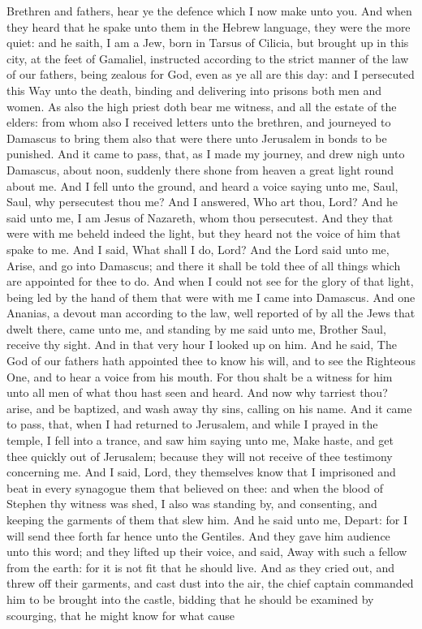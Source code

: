 Brethren and fathers, hear ye the defence which I now make unto you.  And when they heard that he spake unto them in the Hebrew language, they were the more quiet: and he saith,  I am a Jew, born in Tarsus of Cilicia, but brought up in this city, at the feet of Gamaliel, instructed according to the strict manner of the law of our fathers, being zealous for God, even as ye all are this day: and I persecuted this Way unto the death, binding and delivering into prisons both men and women. As also the high priest doth bear me witness, and all the estate of the elders: from whom also I received letters unto the brethren, and journeyed to Damascus to bring them also that were there unto Jerusalem in bonds to be punished. And it came to pass, that, as I made my journey, and drew nigh unto Damascus, about noon, suddenly there shone from heaven a great light round about me. And I fell unto the ground, and heard a voice saying unto me, Saul, Saul, why persecutest thou me? And I answered, Who art thou, Lord? And he said unto me, I am Jesus of Nazareth, whom thou persecutest. And they that were with me beheld indeed the light, but they heard not the voice of him that spake to me. And I said, What shall I do, Lord? And the Lord said unto me, Arise, and go into Damascus; and there it shall be told thee of all things which are appointed for thee to do. And when I could not see for the glory of that light, being led by the hand of them that were with me I came into Damascus. And one Ananias, a devout man according to the law, well reported of by all the Jews that dwelt there, came unto me, and standing by me said unto me, Brother Saul, receive thy sight. And in that very hour I looked up on him. And he said, The God of our fathers hath appointed thee to know his will, and to see the Righteous One, and to hear a voice from his mouth. For thou shalt be a witness for him unto all men of what thou hast seen and heard. And now why tarriest thou? arise, and be baptized, and wash away thy sins, calling on his name. And it came to pass, that, when I had returned to Jerusalem, and while I prayed in the temple, I fell into a trance, and saw him saying unto me, Make haste, and get thee quickly out of Jerusalem; because they will not receive of thee testimony concerning me. And I said, Lord, they themselves know that I imprisoned and beat in every synagogue them that believed on thee: and when the blood of Stephen thy witness was shed, I also was standing by, and consenting, and keeping the garments of them that slew him. And he said unto me, Depart: for I will send thee forth far hence unto the Gentiles.  And they gave him audience unto this word; and they lifted up their voice, and said, Away with such a fellow from the earth: for it is not fit that he should live. And as they cried out, and threw off their garments, and cast dust into the air, the chief captain commanded him to be brought into the castle, bidding that he should be examined by scourging, that he might know for what cause 
